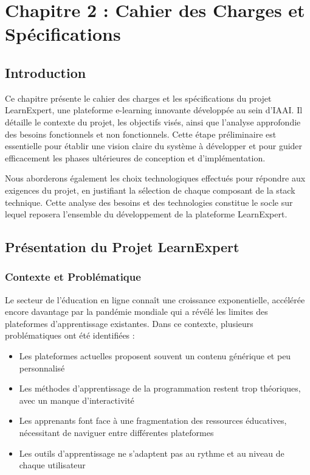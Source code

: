 \chapter*{Chapitre 2 : Cahier des Charges et Spécifications}
\thispagestyle{fancy}
\setcounter{section}{0}
\newpage

\section{Introduction}

Ce chapitre présente le cahier des charges et les spécifications du projet LearnExpert, une plateforme e-learning innovante développée au sein d'IAAI. Il détaille le contexte du projet, les objectifs visés, ainsi que l'analyse approfondie des besoins fonctionnels et non fonctionnels. Cette étape préliminaire est essentielle pour établir une vision claire du système à développer et pour guider efficacement les phases ultérieures de conception et d'implémentation.

Nous aborderons également les choix technologiques effectués pour répondre aux exigences du projet, en justifiant la sélection de chaque composant de la stack technique. Cette analyse des besoins et des technologies constitue le socle sur lequel reposera l'ensemble du développement de la plateforme LearnExpert.

\section{Présentation du Projet LearnExpert}

\subsection{Contexte et Problématique}
Le secteur de l'éducation en ligne connaît une croissance exponentielle, accélérée encore davantage par la pandémie mondiale qui a révélé les limites des plateformes d'apprentissage existantes. Dans ce contexte, plusieurs problématiques ont été identifiées :

\begin{itemize}
  \item Les plateformes actuelles proposent souvent un contenu générique et peu personnalisé
  \item Les méthodes d'apprentissage de la programmation restent trop théoriques, avec un manque d'interactivité
  \item Les apprenants font face à une fragmentation des ressources éducatives, nécessitant de naviguer entre différentes plateformes
  \item Les outils d'apprentissage ne s'adaptent pas au rythme et au niveau de chaque utilisateur
\end{itemize}

